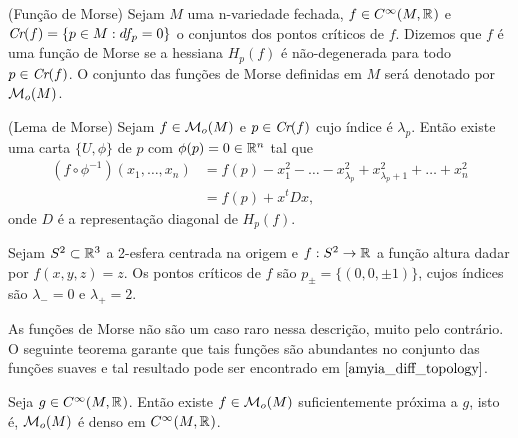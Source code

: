 \documentclass{beamer}
\begin{document}
\begin{frame}
	\begin{definicao}
		(Função de Morse) Sejam $M$ uma n-variedade fechada, $f \in C^{\infty}(M, \mathbb{R}^{})$ e $\textit{Cr}(f) = \{p \in M: df_{p} = 0\}$ o conjuntos dos pontos críticos de $f$. Dizemos que $f$ é uma função de Morse se a hessiana $H_{p}(f)$ é não-degenerada para todo $p \in \textit{Cr}(f)$. O conjunto das funções de Morse definidas em $M$ será denotado por $\mathcal{M}_{o}(M)$. 
	\end{definicao}
	\begin{lema}
		(Lema de Morse) Sejam $f \in \mathcal{M}_{o}(M)$ e $p \in \textit{Cr}(f)$ cujo índice é $\lambda_{p}$. Então existe uma carta $\{U, \phi\}$ de $p$ com $\phi(p)=0 \in \mathbb{R}^{n}$ tal que 
		$$
		\begin{aligned}
		(f\circ \phi^{-1})(x_{1}, \dots, x_{n}) &= f(p)-x_{1}^{2}-\dots -x^{2}_{\lambda_{p}}+x^{2}_{\lambda_{p}+1}+\dots + x^{2}_{n}
		\\
		&=f(p)+x^{t}Dx,
		\end{aligned}
		$$
		onde $D$ é a representação diagonal de $H_{p}(f)$.
	\end{lema}
\end{frame}

\begin{frame}
	\begin{exemplo}
		Sejam $S^{2} \subset \mathbb{R}^{3}$ a 2-esfera centrada na origem e $f:S^{2}\to \mathbb{R}^{}$ a função altura dadar por $f(x,y,z) = z$. Os pontos críticos de $f$ são $p_{\pm} = \{(0,0,\pm 1)\}$, cujos índices são $\lambda_{- } = 0$ e $\lambda_{+ } = 2$.
	\end{exemplo}
	
	As funções de Morse não são um caso raro nessa descrição, muito pelo contrário. O seguinte teorema garante que tais funções são abundantes no conjunto das funções suaves e tal resultado pode ser encontrado em $\cite{amyia_diff_topology}$.
	
	\begin{teorema}
		Seja $g\in C^{\infty}(M, \mathbb{R}^{})$. Então existe $f \in \mathcal{M}_{o}(M)$ suficientemente próxima a $g$, isto é, $\mathcal{M}_{o}(M)$ é denso em $C^{\infty}(M, \mathbb{R}^{})$.
	\end{teorema}
\end{frame}
	
\end{document}
